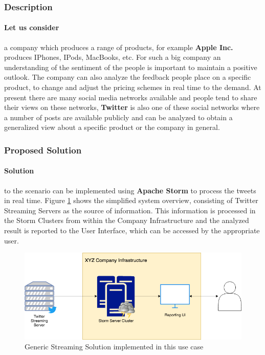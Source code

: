 \documentclass[runningheads,a4paper]{llncs}[2015/06/24]
\begin{document}
\subsubsection{Description}
\paragraph{Let us consider} a company which produces a range of products, for example \textbf{Apple Inc.} produces IPhones, IPods, MacBooks, etc. For such a big company an understanding of the sentiment of the people is important to maintain a positive outlook. The company can also analyze the feedback people place on a specific product, to change and adjust the pricing schemes in real time to the demand.  At present there are many social media networks available and people tend to share their views on these networks,  \textbf{Twitter} is also one of these social networks where a number of posts are available publicly and can be analyzed to obtain a generalized view about a specific product or the company in general.

\subsubsection{Proposed Solution}

\paragraph{Solution} to the scenario can be implemented using \textbf{Apache Storm} to process the tweets in real time. Figure \ref{fig:solution} shows the simplified system overview, consisting of Twitter Streaming Servers as the source of information. This information is processed in the Storm Clusters from within the Company Infrastructure and the analyzed result is reported to the User Interface, which can be accessed by the appropriate user.

\begin{figure}
  \begin{center}
    \includegraphics[width=.7\textwidth]{solution.png}
    \caption{Generic Streaming Solution implemented in this use case}
    \label{fig:solution}
   \end{center}
\end{figure}
\end{document}
